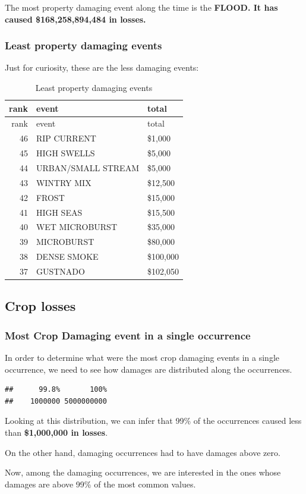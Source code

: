 The most property damaging event along the time is the \textbf{FLOOD. It
has caused \$168,258,894,484 in losses.}

\subsubsection{Least property damaging
events}\label{least-property-damaging-events}

Just for curiosity, these are the less damaging events:

\begin{longtable}[]{@{}rll@{}}
\caption{Least property damaging events}\tabularnewline
\toprule
rank & event & total\tabularnewline
\midrule
\endfirsthead
\toprule
rank & event & total\tabularnewline
\midrule
\endhead
46 & RIP CURRENT & \$1,000\tabularnewline
45 & HIGH SWELLS & \$5,000\tabularnewline
44 & URBAN/SMALL STREAM & \$5,000\tabularnewline
43 & WINTRY MIX & \$12,500\tabularnewline
42 & FROST & \$15,000\tabularnewline
41 & HIGH SEAS & \$15,500\tabularnewline
40 & WET MICROBURST & \$35,000\tabularnewline
39 & MICROBURST & \$80,000\tabularnewline
38 & DENSE SMOKE & \$100,000\tabularnewline
37 & GUSTNADO & \$102,050\tabularnewline
\bottomrule
\end{longtable}

\subsection{Crop losses}\label{crop-losses}

\subsubsection{Most Crop Damaging event in a single
occurrence}\label{most-crop-damaging-event-in-a-single-occurrence}

In order to determine what were the most crop damaging events in a
single occurrence, we need to see how damages are distributed along the
occurrences.

\begin{verbatim}
##      99.8%       100% 
##    1000000 5000000000
\end{verbatim}

Looking at this distribution, we can infer that 99\% of the occurrences
caused less than \textbf{\$1,000,000 in losses}.

On the other hand, damaging occurrences had to have damages above zero.

Now, among the damaging occurrences, we are interested in the ones whose
damages are above 99\% of the most common values.

